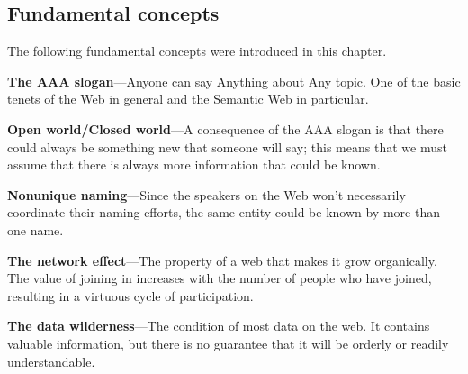 \subsection{Fundamental concepts}

The following fundamental concepts were introduced in this chapter.

\textbf{The AAA slogan}---Anyone can say Anything about Any topic. One
of the basic tenets of the Web in general and the Semantic Web in
particular.

\textbf{Open world/Closed world}---A consequence of the AAA slogan is
that there could always be something new that someone will say; this
means that we must assume that there is always more information that
could be known.

\textbf{Nonunique naming}---Since the speakers on the Web won't
necessarily coordinate their naming efforts, the same entity could be
known by more than one name.

\textbf{The network effect}---The property of a web that makes it grow
organically. The value of joining in increases with the number of people
who have joined, resulting in a virtuous cycle of participation.

\textbf{The data wilderness}---The condition of most data on the web. It
contains valuable information, but there is no guarantee that it will be
orderly or readily understandable.



